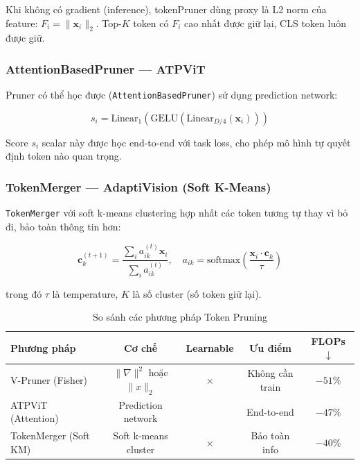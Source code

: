 \documentclass[13pt,a4paper]{article}
\newcommand{\tmark}{\checkmark}
\newcommand{\xmark}{$\times$}
\begin{document}
Khi không có gradient (inference), tokenPruner dùng proxy là L2 norm của feature: $F_i = \|\mathbf{x}_i\|_2$. Top-$K$ token có $F_i$ cao nhất được giữ lại, CLS token luôn được giữ.

\subsubsection{AttentionBasedPruner --- ATPViT}

Pruner có thể học được (\texttt{AttentionBasedPruner}) sử dụng prediction network:

\begin{equation}
s_i = \text{Linear}_{1}(\text{GELU}(\text{Linear}_{D/4}(\mathbf{x}_i)))
\end{equation}

Score $s_i$ scalar này được học end-to-end với task loss, cho phép mô hình tự quyết định token nào quan trọng.

\subsubsection{TokenMerger --- AdaptiVision (Soft K-Means)}

\texttt{TokenMerger} với soft k-means clustering hợp nhất các token tương tự thay vì bỏ đi, bảo toàn thông tin hơn:

\begin{equation}
\mathbf{c}_k^{(t+1)} = \frac{\sum_i a_{ik}^{(t)} \mathbf{x}_i}{\sum_i a_{ik}^{(t)}}, \quad
a_{ik} = \text{softmax}\!\left(\frac{\mathbf{x}_i \cdot \mathbf{c}_k}{\tau}\right)
\end{equation}

trong đó $\tau$ là temperature, $K$ là số cluster (số token giữ lại).

\begin{table}[H]
\centering
\caption{So sánh các phương pháp Token Pruning}
\label{tab:token_pruning}
\begin{tabular}{lcccc}
\toprule
\textbf{Phương pháp} & \textbf{Cơ chế} & \textbf{Learnable} & \textbf{Ưu điểm} & \textbf{FLOPs $\downarrow$} \\
\midrule
V-Pruner (Fisher)     & $\|\nabla\|^2$ hoặc $\|x\|_2$ & \xmark & Không cần train & $-51\%$ \\
ATPViT (Attention)    & Prediction network             & \tmark & End-to-end     & $-47\%$ \\
TokenMerger (Soft KM) & Soft k-means cluster           & \xmark & Bảo toàn info  & $-40\%$ \\
\bottomrule
\end{tabular}
\end{table}
\end{document}
